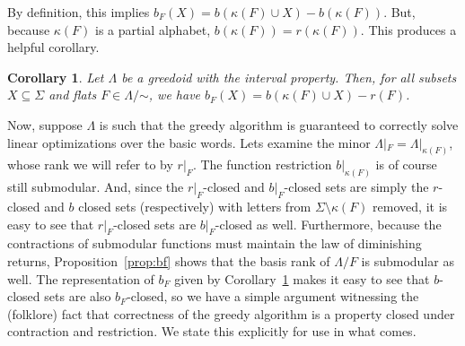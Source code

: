 \documentclass[11pt]{article}
\newtheorem{corollary}[theorem]{Corollary}
\newcommand{\univ}{\Sigma}
\newcommand{\glang}{\Lambda}
\begin{document}
By definition, this implies $b_F(X) = b(\kappa(F)\cup X) - b(\kappa(F))$.
But, because $\kappa(F)$ is a partial alphabet, $b(\kappa(F)) = r(\kappa(F))$.
This produces a helpful corollary.
\begin{corollary}\label{cor:bf-eq}
    Let $\glang$ be a greedoid with the interval property.
    Then, for all subsets $X\subseteq\univ$ and flats $F\in\glang/\mathord{\sim}$, we have $b_{F}(X) = b(\kappa(F)\cup X) - r(F)$.
\end{corollary}

\iffalse
Now, suppose $\glang$ is such that the greedy algorithm is guaranteed to correctly solve linear optimizations over the basic words.
Lets examine the minor $\glang|_F = \glang|_{\kappa(F)}$, whose rank we will refer to by $r|_F$.
The function restriction $b|_{\kappa(F)}$ is of course still submodular.
And, since the $r|_F$-closed and $b|_F$-closed sets are simply the $r$-closed and $b$ closed sets (respectively) with letters from $\univ\setminus\kappa(F)$ removed, it is easy to see that $r|_F$-closed sets are $b|_F$-closed as well.
Furthermore, because the contractions of submodular functions must maintain the law of diminishing returns, Proposition~\ref{prop:bf} shows that the basis rank of $\glang/F$ is submodular as well.
The representation of $b_F$ given by Corollary~\ref{cor:bf-eq} makes it easy to see that $b$-closed sets are also $b_F$-closed, so we have a simple argument witnessing the (folklore) fact that correctness of the greedy algorithm is a property closed under contraction and restriction.
We state this explicitly for use in what comes.
\end{document}

